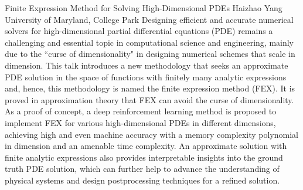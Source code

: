 \begin{addmargin}[2em]{0em}
\vspace{2ex}
\abs
{Finite Expression Method for Solving High-Dimensional PDEs}
{Haizhao Yang}
{University of Maryland, College Park}
{Designing efficient and accurate numerical solvers for high-dimensional partial differential equations (PDE) remains a challenging and essential topic in computational science and engineering, mainly due to the ``curse of dimensionality" in designing numerical schemes that scale in dimension. This talk introduces a new methodology that seeks an approximate PDE solution in the space of functions with finitely many analytic expressions and, hence, this methodology is named the finite expression method (FEX). It is proved in approximation theory that FEX can avoid the curse of dimensionality. As a proof of concept, a deep reinforcement learning method is proposed to implement FEX for various high-dimensional PDEs in different dimensions, achieving high and even machine accuracy with a memory complexity polynomial in dimension and an amenable time complexity. An approximate solution with finite analytic expressions also provides interpretable insights into the ground truth PDE solution, which can further help to advance the understanding of physical systems and design postprocessing techniques for a refined solution.}

\end{addmargin}


